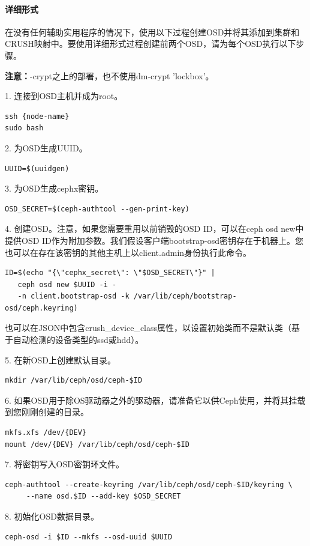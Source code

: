 \documentclass[12pt,UTF8]{ctexbook}
\begin{document}
\paragraph{详细形式}
在没有任何辅助实用程序的情况下，使用以下过程创建OSD并将其添加到集群和CRUSH映射中。要使用详细形式过程创建前两个OSD，请为每个OSD执行以下步骤。

\textbf{注意：}-crypt之上的部署，也不使用dm-crypt 'lockbox'。

1. 连接到OSD主机并成为root。
\begin{verbatim}
ssh {node-name}
sudo bash
\end{verbatim}

2. 为OSD生成UUID。
\begin{verbatim}
UUID=$(uuidgen)
\end{verbatim}

3. 为OSD生成cephx密钥。
\begin{verbatim}
OSD_SECRET=$(ceph-authtool --gen-print-key)
\end{verbatim}

4. 创建OSD。注意，如果您需要重用以前销毁的OSD ID，可以在ceph osd new中提供OSD ID作为附加参数。我们假设客户端bootstrap-osd密钥存在于机器上。您也可以在存在该密钥的其他主机上以client.admin身份执行此命令。
\begin{verbatim}
ID=$(echo "{\"cephx_secret\": \"$OSD_SECRET\"}" | 
   ceph osd new $UUID -i - 
   -n client.bootstrap-osd -k /var/lib/ceph/bootstrap-osd/ceph.keyring)
\end{verbatim}

也可以在JSON中包含crush_device_class属性，以设置初始类而不是默认类（基于自动检测的设备类型的ssd或hdd）。

5. 在新OSD上创建默认目录。
\begin{verbatim}
mkdir /var/lib/ceph/osd/ceph-$ID
\end{verbatim}

6. 如果OSD用于除OS驱动器之外的驱动器，请准备它以供Ceph使用，并将其挂载到您刚刚创建的目录。
\begin{verbatim}
mkfs.xfs /dev/{DEV}
mount /dev/{DEV} /var/lib/ceph/osd/ceph-$ID
\end{verbatim}

7. 将密钥写入OSD密钥环文件。
\begin{verbatim}
ceph-authtool --create-keyring /var/lib/ceph/osd/ceph-$ID/keyring \
     --name osd.$ID --add-key $OSD_SECRET
\end{verbatim}

8. 初始化OSD数据目录。
\begin{verbatim}
ceph-osd -i $ID --mkfs --osd-uuid $UUID
\end{verbatim}
\end{document}
